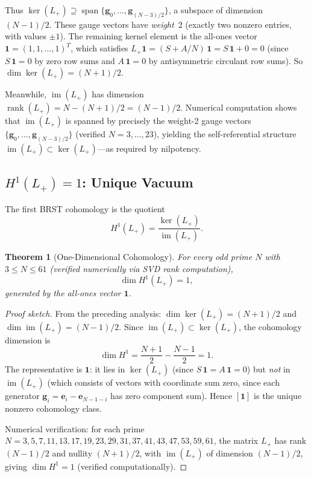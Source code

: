 \documentclass[aip,jmp,reprint,superscriptaddress,floatfix,nofootinbib]{revtex4-2}
\newtheorem{theorem}{Theorem}
\theoremstyle{definition}
\theoremstyle{remark}
\begin{document}
Thus $\ker(L_+) \supseteq
\operatorname{span}\{\mathbf{g}_0, \ldots, \mathbf{g}_{(N-3)/2}\}$,
a subspace of dimension $(N{-}1)/2$.  These gauge vectors have
\emph{weight}~$2$ (exactly two nonzero entries, with values $\pm 1$).
The remaining kernel element is the all-ones vector
$\mathbf{1} = (1, 1, \ldots, 1)^T$, which satisfies
$L_+ \mathbf{1} = (S + A/N)\,\mathbf{1} = S\,\mathbf{1} + 0 = 0$
(since $S\,\mathbf{1} = 0$ by zero row sums and $A\,\mathbf{1} = 0$
by antisymmetric circulant row sums).  So
$\dim\ker(L_+) = (N{+}1)/2$.

Meanwhile, $\operatorname{im}(L_+)$ has dimension
$\operatorname{rank}(L_+) = N - (N{+}1)/2 = (N{-}1)/2$.  Numerical
computation shows that $\operatorname{im}(L_+)$ is spanned by
precisely the weight-2 gauge vectors
$\{\mathbf{g}_0, \ldots, \mathbf{g}_{(N-3)/2}\}$ (verified
$N = 3, \ldots, 23$), yielding the self-referential structure
$\operatorname{im}(L_+) \subset \ker(L_+)$---as required by
nilpotency.

\subsection{\texorpdfstring{$H^1(L_+) = 1$}{H\^{}1(L+) = 1}: Unique Vacuum}
\label{sec:brst:cohomology}

The first BRST cohomology is the quotient
\begin{equation}\label{eq:H1}
H^1(L_+) = \frac{\ker(L_+)}{\operatorname{im}(L_+)}.
\end{equation}

\begin{theorem}[One-Dimensional Cohomology]\label{thm:H1}
For every odd prime $N$ with $3 \le N \le 61$ (verified numerically
via SVD rank computation),
\begin{equation}\label{eq:H1-dim}
\dim H^1(L_+) = 1,
\end{equation}
generated by the all-ones vector $\mathbf{1}$.
\end{theorem}

\begin{proof}[Proof sketch]
From the preceding analysis:
$\dim\ker(L_+) = (N{+}1)/2$ and $\dim\operatorname{im}(L_+) =
(N{-}1)/2$.  Since
$\operatorname{im}(L_+) \subset \ker(L_+)$, the cohomology
dimension is
\begin{equation}
\dim H^1 = \frac{N+1}{2} - \frac{N-1}{2} = 1.
\end{equation}
The representative is $\mathbf{1}$: it lies in $\ker(L_+)$ (since
$S\,\mathbf{1} = A\,\mathbf{1} = 0$) but \emph{not} in
$\operatorname{im}(L_+)$ (which consists of vectors with
coordinate sum zero, since each generator
$\mathbf{g}_i = \mathbf{e}_i - \mathbf{e}_{N-1-i}$ has zero
component sum).  Hence $[\mathbf{1}]$ is the unique nonzero
cohomology class.

Numerical verification: for each prime $N = 3, 5, 7, 11, 13, 17,
19, 23, 29, 31, 37, 41, 43, 47, 53, 59, 61$, the matrix $L_+$ has
rank $(N{-}1)/2$ and nullity $(N{+}1)/2$, with $\operatorname{im}(L_+)$
of dimension $(N{-}1)/2$, giving $\dim H^1 = 1$ (verified
computationally).
\end{proof}
\end{document}
